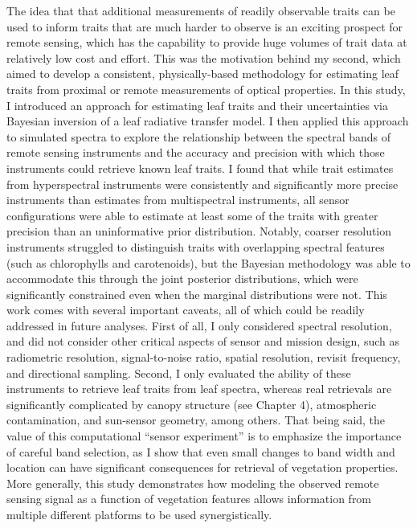 The idea that that additional measurements of readily observable traits can be used to inform traits that are much harder to observe is an exciting prospect for remote sensing, which has the capability to provide huge volumes of trait data at relatively low cost and effort.
This was the motivation behind my second, which aimed to develop a consistent, physically-based methodology for estimating leaf traits from proximal or remote measurements of optical properties.
In this study, I introduced an approach for estimating leaf traits and their uncertainties via Bayesian inversion of a leaf radiative transfer model.
I then applied this approach to simulated spectra to explore the relationship between the spectral bands of remote sensing instruments and the accuracy and precision with which those instruments could retrieve known leaf traits.
I found that while trait estimates from hyperspectral instruments were consistently and significantly more precise instruments than estimates from multispectral instruments, all sensor configurations were able to estimate at least some of the traits with greater precision than an uninformative prior distribution.
Notably, coarser resolution instruments struggled to distinguish traits with overlapping spectral features (such as chlorophylls and carotenoids), but the Bayesian methodology was able to accommodate this through the joint posterior distributions, which were significantly constrained even when the marginal distributions were not.
This work comes with several important caveats, all of which could be readily addressed in future analyses.
First of all, I only considered spectral resolution, and did not consider other critical aspects of sensor and mission design, such as radiometric resolution, signal-to-noise ratio, spatial resolution, revisit frequency, and directional sampling.
Second, I only evaluated the ability of these instruments to retrieve leaf traits from leaf spectra, whereas real retrievals are significantly complicated by canopy structure (see Chapter 4), atmospheric contamination, and sun-sensor geometry, among others.
That being said, the value of this computational ``sensor experiment'' is to emphasize the importance of careful band selection, as I show that even small changes to band width and location can have significant consequences for retrieval of vegetation properties.
More generally, this study demonstrates how modeling the observed remote sensing signal as a function of vegetation features allows information from multiple different platforms to be used synergistically.

